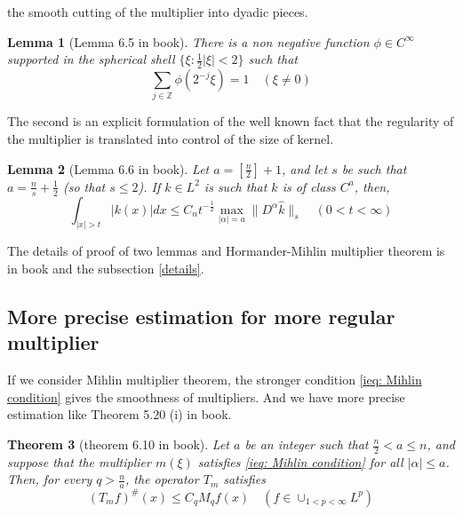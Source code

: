 \documentclass{report}
\theoremstyle{definition}
\theoremstyle{definition}
\theoremstyle{plain}
\newtheorem{theorem}{Theorem}
\newtheorem{lemma}[theorem]{Lemma}
\numberwithin{theorem}{subsection}
\numberwithin{remark}{subsection}
\newcommand{\norm}[1]{\lVert#1\rVert}
\newcommand{\abs}[1]{\left\lvert#1\right\rvert}
\begin{document}
the smooth cutting of the multiplier into dyadic pieces.
\begin{lemma}[Lemma 6.5 in book]
    There is a non negative function $\phi\in C^\infty$ supported in the spherical shell $\{\xi: \frac{1}{2}\abs{\xi}<2\}$ such that
    \begin{equation*}
        \sum_{j\in\mathbb{Z}}\phi(2^{-j}\xi)=1\quad (\xi\neq 0)
    \end{equation*}
\end{lemma}
The second is an explicit formulation of the
well known fact that the regularity of the multiplier is translated into control of the size of kernel.
\begin{lemma}[Lemma 6.6 in book]
    Let $a=[\frac{n}{2}]+1$, and let $s$ be such that $a=\frac{n}{s}+\frac{1}{2}$ (so that $s\leq 2$). If $k\in L^2$ is
    such that $\hat{k}$ is of class $C^a$, then,
    \begin{equation*}
        \int_{\abs{x}>t}\abs{k(x)}dx\leq C_n t^{-\frac{1}{2}}\max_{\abs{\alpha}=a}{\norm{D^{\alpha}\hat{k}}_s}\quad (0<t<\infty)
    \end{equation*}
\end{lemma}
The details of proof of two lemmas and Hormander-Mihlin multiplier theorem is in book and the subsection \ref{details}.


\subsection{More precise estimation for more regular multiplier}
If we consider Mihlin multiplier theorem, the stronger condition \eqref{ieq: Mihlin condition} gives the smoothness of multipliers. And we have more precise estimation like Theorem 5.20 (i) in book.
\begin{theorem}[theorem 6.10 in book]
    Let $a$ be an integer such that $\frac{n}{2}<a\leq n$, and suppose that the multiplier $m(\xi)$ satisfies
    \eqref{ieq: Mihlin condition} for all $\abs{\alpha}\leq a$. Then, for every $q>\frac{n}{a}$, the operator $T_m$ satisfies
    \begin{equation*}
        (T_mf)^\#(x)\leq C_qM_qf(x)\quad (f\in\cup_{1<p<\infty}L^p)
    \end{equation*}
\end{theorem}
\end{document}
